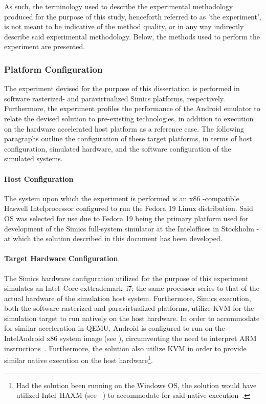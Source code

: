 As such, the terminology used to describe the experimental methodology produced for the purpose of this study, henceforth referred to as 'the experiment', is not meant to be indicative of the method quality, or in any way indirectly describe said experimental methodology.
Below, the methods used to perform the experiment are presented.

\subsubsection{Platform Configuration}
\label{sec:experimentalmethodology_platformconfiguration}
The experiment devised for the purpose of this dissertation is performed in software rasterized- and paravirtualized Simics platforms, respectively.
Furthermore, the experiment profiles the performance of the Android emulator to relate the devised solution to pre-existing technologies, in addition to execution on the hardware accelerated host platform as a reference case.
The following paragraphs outline the configuration of these target platforms, in terms of host configuration, simulated hardware, and the software configuration of the simulated systems.

\paragraph{Host Configuration}
\label{par:experimentalmethodology_platformconfiguration_hostconfiguration}
The system upon which the experiment is performed is an x86 -compatible Haswell Intel\circledR processor configured to run the Fedora 19 Linux distribution.
Said OS was selected for use due to Fedora 19 being the primary platform used for development of the Simics full-system simulator at the Intel\circledR offices in Stockholm - at which the solution described in this document has been developed.

\paragraph{Target Hardware Configuration}
\label{par:experimentalmethodology_platformconfiguration:targethardwareconfiguration}
The Simics hardware configuration utilized for the purpose of this experiment simulates an Intel\circledR\ Core	exttrademark\ i7; the same processor series to that of the actual hardware of the simulation host system.
Furthermore, Simics execution, both the software rasterized and paravirtualized platforms, utilize KVM for the simulation target to run natively on the host hardware.
In order to accommodate for similar acceleration in QEMU, Android is configured to run on the Intel\circledR Android x86 system image (see ), circumventing the need to interpret ARM instructions~.
Furthermore, the solution also utilize KVM in order to provide similar native execution on the host hardware\footnote{Had the solution been running on the Windows OS, the solution would have utilized Intel\circledR\ HAXM (see ~) to accommodate for said native execution~.}.

